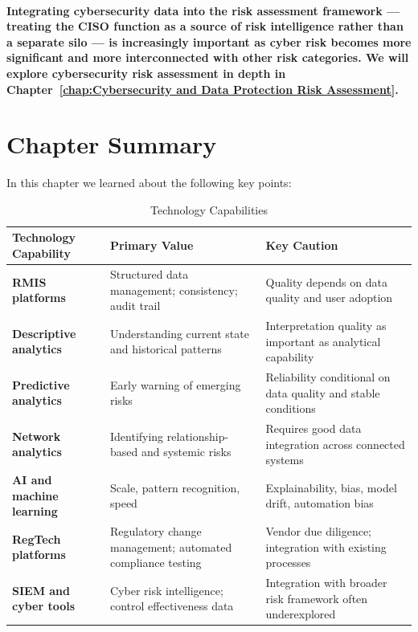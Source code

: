 \paragraph{Integrating cybersecurity data into the risk assessment framework — treating the CISO function as a source of risk intelligence rather than a separate silo — is increasingly important as cyber risk becomes more significant and more interconnected with other risk categories. We will explore cybersecurity risk assessment in depth in Chapter~\ref{chap:Cybersecurity and Data Protection Risk Assessment}.}

\newpage
\section{Chapter Summary}
In this chapter we learned about the following key points:
\begin{table}[H]
  \centering
  \renewcommand{\arraystretch}{1.5}
  \begin{tabularx}{\textwidth}{ | >{\raggedright\arraybackslash}p{} 
								| >{\raggedright\arraybackslash}p{} 
                                | >{\raggedright\arraybackslash}X | }
    \hline
    \textbf{Technology Capability} & \textbf{Primary Value} & \textbf{Key Caution} \\
    \hline
    \textbf{RMIS platforms} & Structured data management; consistency; audit trail & Quality depends on data quality and user adoption\\
    \hline
    \textbf{Descriptive analytics} & Understanding current state and historical patterns & Interpretation quality as important as analytical capability\\
    \hline
    \textbf{Predictive analytics} & Early warning of emerging risks & Reliability conditional on data quality and stable conditions\\
    \hline
    \textbf{Network analytics} & Identifying relationship-based and systemic risks & Requires good data integration across connected systems\\
    \hline
    \textbf{AI and machine learning} & Scale, pattern recognition, speed & Explainability, bias, model drift, automation bias\\
    \hline
    \textbf{RegTech platforms} & Regulatory change management; automated compliance testing & Vendor due diligence; integration with existing processes\\
    \hline
    \textbf{SIEM and cyber tools} & Cyber risk intelligence; control effectiveness data & Integration with broader risk framework often underexplored\\
    \hline
  \end{tabularx}
  \caption{Technology Capabilities}
\end{table}

